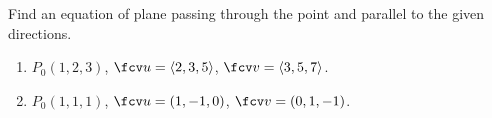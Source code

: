 Find an equation of plane passing through the point and parallel to the given directions.

\begin{enumerate}
\item $P_0(1,2,3)$, $\fcv u=\langle2,3,5\rangle$, $\fcv v=\langle3,5,7 \rangle$.
\item $P_0(1,1,1)$, $\fcv u=(1,-1,0)$, $\fcv v= (0,1,-1)$.
\end{enumerate}